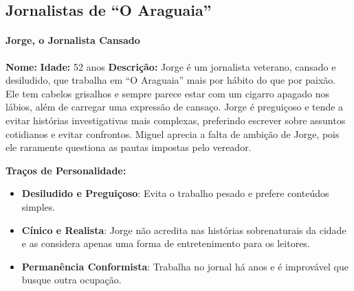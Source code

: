 \subsection{Jornalistas de ``O Araguaia''}

\begin{personagem}
    

\paragraph{Jorge, o Jornalista Cansado}  
\textbf{Nome:}   
\textbf{Idade:} 52 anos  
\textbf{Descrição:}  
Jorge é um jornalista veterano, cansado e desiludido, que trabalha em ``O Araguaia'' mais por hábito do que por paixão. Ele tem cabelos grisalhos e sempre parece estar com um cigarro apagado nos lábios, além de carregar uma expressão de cansaço. Jorge é preguiçoso e tende a evitar histórias investigativas mais complexas, preferindo escrever sobre assuntos cotidianos e evitar confrontos. Miguel aprecia a falta de ambição de Jorge, pois ele raramente questiona as pautas impostas pelo vereador.

\textbf{Traços de Personalidade:}
\begin{itemize}
    \item \textbf{Desiludido e Preguiçoso}: Evita o trabalho pesado e prefere conteúdos simples.
    \item \textbf{Cínico e Realista}: Jorge não acredita nas histórias sobrenaturais da cidade e as considera apenas uma forma de entretenimento para os leitores.
    \item \textbf{Permanência Conformista}: Trabalha no jornal há anos e é improvável que busque outra ocupação.
\end{itemize}
\end{personagem}
